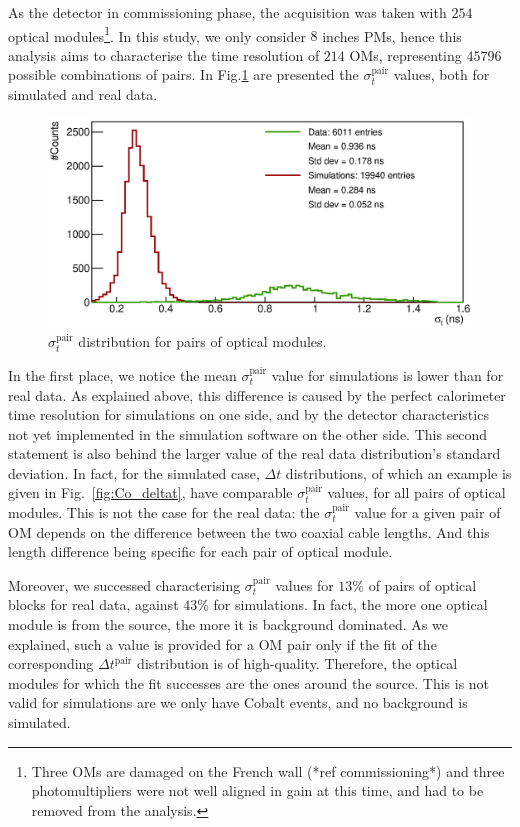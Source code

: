 As the detector in commissioning phase, the acquisition was taken with $254$ optical modules\footnote{Three OMs are damaged on the French wall (*ref commissioning*) and three photomultipliers were not well aligned in gain at this time, and had to be removed from the analysis.}.
In this study, we only consider $8$ inches PMs, hence this analysis aims to characterise the time resolution of $214$ OMs, representing $45796$ possible combinations of pairs.
In Fig.\ref{fig:Co_corr_sigma} are presented the $\sigma_{t}^{\text{pair}}$ values, both for simulated and real data.
\begin{figure}[h]
  \centering
  \includegraphics[width=15cm]{commissioning/fig_commissioning/Co_corr_sigma.eps}
  \caption{$\sigma_{t}^{\text{pair}}$ distribution for pairs of optical modules.
    \label{fig:Co_corr_sigma}}
\end{figure}
In the first place, we notice the mean $\sigma_{t}^{\text{pair}}$ value for simulations is lower than for real data.
As explained above, this difference is caused by the perfect calorimeter time resolution for simulations on one side, and by the detector characteristics not yet implemented in the simulation software on the other side.
This second statement is also behind the larger value of the real data distribution's standard deviation.
In fact, for the simulated case, $\Delta{t}$ distributions, of which an example is given in Fig.~\ref{fig:Co_deltat}, have comparable $\sigma_{t}^{\text{pair}}$ values, for all pairs of optical modules.
This is not the case for the real data: the $\sigma_{t}^{\text{pair}}$ value for a given pair of OM depends on the difference between the two coaxial cable lengths.
And this length difference being specific for each pair of optical module.

Moreover, we successed characterising $\sigma_{t}^{\text{pair}}$ values for $13$\% of pairs of optical blocks for real data, against $43$\% for simulations.
In fact, the more one optical module is from the source, the more it is background dominated.
As we explained, such a value is provided for a OM pair only if the fit of the corresponding $\Delta t^{\text{pair}}$ distribution is of high-quality.
Therefore, the optical modules for which the fit successes are the ones around the source.
This is not valid for simulations are we only have Cobalt events, and no background is simulated.

